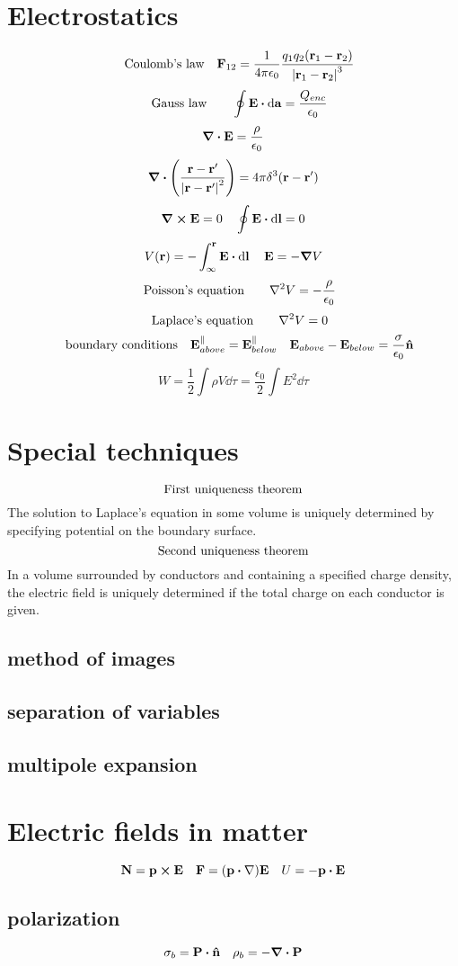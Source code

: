 \documentclass[12pt]{article}
\begin{document}
\section{Electrostatics}
\[\qq{Coulomb's law}\vb{F}_{12}=\frac{1}{4\pi\epsilon_0}\frac{q_1q_2(\vb{r}_1-\vb{r}_2)}{\vqty{\vb{r}_1-\vb{r}_2}^3}\]
\[\qq{Gauss law}\quad \oint\vb{E}\vdot\dd{\vb{a}}=\frac{Q_{enc}}{\epsilon_0}\]
\[\div{\vb{E}}=\frac{\rho}{\epsilon_0}\]
\[\div{\qty(\frac{\vb{r}-\vb{r}'}{\vqty{\vb{r}-\vb{r}'}^2})}=4\pi\delta^3(\vb{r}-\vb{r}')\]
\[\curl{\vb{E}}=0\quad \oint\vb{E}\vdot\dd{\vb{l}}=0\]
\[V(\vb{r})=-\int_{\infty}^{\vb{r}}\vb{E}\vdot\dd{\vb{l}}\quad\vb{E}=-\grad{V}\]
\[\qq{Poisson's equation}\quad\laplacian{V}=-\frac{\rho}{\epsilon_0}\]
\[\qq{Laplace's equation} \quad\laplacian{V}=0\]
\[\qq{boundary conditions} \vb{E}^{\parallel}_{above}=\vb{E}^{\parallel}_{below}\quad \vb{E}_{above}-\vb{E}_{below}=\frac{\sigma}{\epsilon_0}\vu{n} \]
\[W=\frac{1}{2}\int\rho{V}\dd{\tau}=\frac{\epsilon_0}{2}\int{E^2}\dd\tau\]
\section{Special techniques}
\[\qq{First uniqueness theorem}\]
The solution to Laplace's equation in some volume is uniquely determined by specifying potential on the boundary surface.
\[\qq{Second uniqueness theorem}\]
In a volume surrounded by conductors and containing a specified charge density, the electric field is uniquely determined if the total charge on each conductor is given.
\subsection*{method of images}
\subsection*{separation of variables}
\subsection*{multipole expansion}
\section{Electric fields in matter}
\[\vb{N}=\vb{p}\cp\vb{E}\quad\vb{F}=\qty(\vb{p}\vdot\nabla)\vb{E}\quad U=-\vb{p}\vdot\vb{E}\]
\subsection*{polarization}
\[\sigma_b=\vb{P}\vdot\vu{n}\quad\rho_b=-\div{\vb{P}}\]
\end{document}
